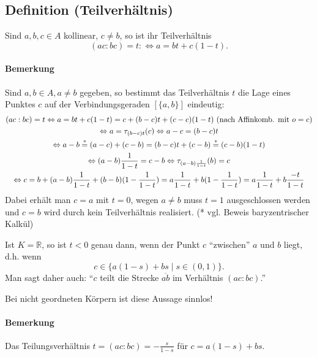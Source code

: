 \subsection{Definition (Teilverhältnis)}
\begin{Definition}[Teilverhältnis]
	Sind $ a,b,c\in A $ kollinear, $ c\neq b $, so ist ihr Teilverhältnis
		\[ (ac:bc) = t :\Leftrightarrow a=bt+c(1-t). \]
\end{Definition}		
\paragraph{Bemerkung}
	Sind $ a,b\in A,a\neq b $ gegeben, so bestimmt das Teilverhältnis $ t $ die Lage eines Punktes $ c $ auf der Verbindungsgeraden $ [\{a,b\}] $ eindeutig:
		\begin{gather*}
		(ac:bc) = t \Leftrightarrow a=bt+c(1-t) = c+ (b-c)t + (c-c)(1-t)\text{ (nach Affinkomb. mit $ o = c $)}\\
		\Leftrightarrow a=\tau_{(b-c)t}(c)\Leftrightarrow a-c = (b-c)t\\
		\Leftrightarrow a-b \overset{*}{=} (a-c)+(c-b) = (b-c)t + (c-b) \overset{*}{=} (c-b)(1-t)\\
		\Leftrightarrow (a-b)\frac{1}{1-t} = c-b \Leftrightarrow \tau_{(a-b)\frac{1}{1-t}}(b) = c\\
		\Leftrightarrow c = b+(a-b)\frac{1}{1-t} + (b-b)(1-\frac{1}{1-t}) = a\frac{1}{1-t}+b(1-\frac{1}{1-t})
		=a\frac{1}{1-t}+b\frac{-t}{1-t}
		\end{gather*}
	Dabei erhält man $ c = a $ mit $ t = 0 $, wegen $ a\neq b $ muss $ t=1 $ ausgeschlossen werden und $ c = b $ wird durch kein Teilverhältnis realisiert. (* vgl. Beweis baryzentrischer Kalkül)
	
	Ist $ K=\mathbb{R} $, so ist $ t<0 $ genau dann, wenn der Punkt $ c $ "`zwischen"' $ a $ und $ b $ liegt, d.h. wenn
		\[ c\in \{a(1-s)+bs\mid s\in (0,1)\}. \]
	Man sagt daher auch: "`$ c $ teilt die Strecke $ \overline{ab} $ im Verhältnis $ (ac:bc) $."'
	
	Bei nicht geordneten Körpern ist diese Aussage sinnlos!
	
\paragraph{Bemerkung}
	Das Teilungsverhältnis $ t = (ac:bc) = -\frac{s}{1-s} $ für $ c=a(1-s)+bs $.

